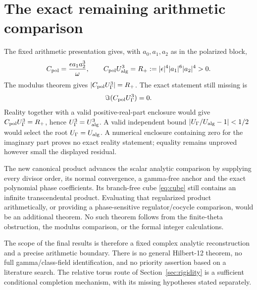 \section{The exact remaining arithmetic comparison}\label{sec:remaining}
The fixed arithmetic presentation gives, with $a_0,a_1,a_2$ as in the polarized block,
\[
 C_{\rm pol}=\frac{\epsilon a_1a_2^3}{\omega},\qquad
 C_{\rm pol}U_{\rm alg}^3=R_+:=|\epsilon|^4|a_1|^6|a_2|^4>0.
\]
The modulus theorem gives $|C_{\rm pol}U_\Gamma^3|=R_+$. The exact statement still missing is
\begin{equation}\label{eq:remaining-reality}
 \Im(C_{\rm pol}U_\Gamma^3)=0.
\end{equation}
Reality together with a valid positive-real-part enclosure would give $C_{\rm pol}U_\Gamma^3=R_+$, hence $U_\Gamma^3=U_{\rm alg}^3$. A valid independent bound $|U_\Gamma/U_{\rm alg}-1|<1/2$ would select the root $U_\Gamma=U_{\rm alg}$. A numerical enclosure containing zero for the imaginary part proves no exact reality statement; equality remains unproved however small the displayed residual.

The new canonical product advances the scalar analytic comparison by supplying every divisor order, its normal convergence, a gamma-free anchor and the exact polynomial phase coefficients. Its branch-free cube \eqref{eq:cube} still contains an infinite transcendental product. Evaluating that regularized product arithmetically, or providing a phase-sensitive regulator/cocycle comparison, would be an additional theorem. No such theorem follows from the finite-theta obstruction, the modulus comparison, or the formal integer calculations.

The scope of the final results is therefore a fixed complex analytic reconstruction and a precise arithmetic boundary. There is no general Hilbert-12 theorem, no full gamma/class-field identification, and no priority assertion based on a literature search. The relative torus route of Section~\ref{sec:rigidity} is a sufficient conditional completion mechanism, with its missing hypotheses stated separately.
